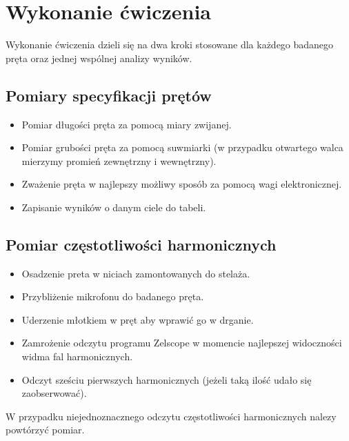 \documentclass[a4paper,12pts]{article}
\begin{document}
	
	\section{Wykonanie ćwiczenia}
	Wykonanie ćwiczenia dzieli się na dwa kroki stosowane dla każdego badanego pręta oraz jednej wspólnej analizy wyników.
	\subsection{Pomiary specyfikacji prętów}
	\begin{itemize}
		\item Pomiar długości pręta za pomocą miary zwijanej.
		\item Pomiar grubości pręta za pomocą suwmiarki (w przypadku otwartego walca mierzymy promień zewnętrzny i wewnętrzny).
		\item Zważenie pręta w najlepszy możliwy sposób za pomocą wagi elektronicznej.
		\item Zapisanie wyników o danym ciele do tabeli.
	\end{itemize}

	\subsection{Pomiar częstotliwości harmonicznych}
	\begin{itemize}
		\item Osadzenie preta w niciach zamontowanych do stelaża.
		\item Przybliżenie mikrofonu do badanego pręta.
		\item Uderzenie młotkiem w pręt aby wprawić go w drganie.
		\item Zamrożenie odczytu programu Zelscope w momencie najlepszej widoczności widma fal harmonicznych.
		\item Odczyt sześciu pierwszych harmonicznych (jeżeli taką ilość udało się zaobserwować).
	\end{itemize}
	W przypadku niejednoznacznego odczytu częstotliwości harmonicznych nalezy powtórzyć pomiar.
	
\end{document}
